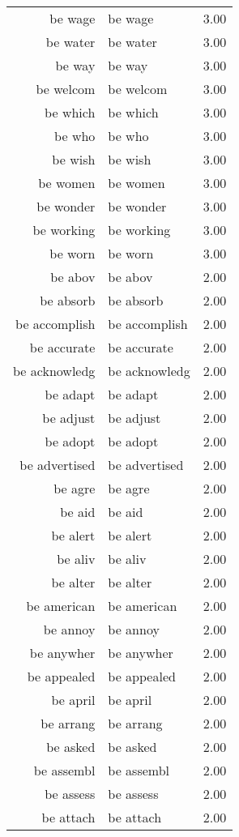 \begin{table}[ht]
\begin{tabular}{rlr}
  be wage & be wage & 3.00 \\ 
  be water & be water & 3.00 \\ 
  be way & be way & 3.00 \\ 
  be welcom & be welcom & 3.00 \\ 
  be which & be which & 3.00 \\ 
  be who & be who & 3.00 \\ 
  be wish & be wish & 3.00 \\ 
  be women & be women & 3.00 \\ 
  be wonder & be wonder & 3.00 \\ 
  be working & be working & 3.00 \\ 
  be worn & be worn & 3.00 \\ 
  be abov & be abov & 2.00 \\ 
  be absorb & be absorb & 2.00 \\ 
  be accomplish & be accomplish & 2.00 \\ 
  be accurate & be accurate & 2.00 \\ 
  be acknowledg & be acknowledg & 2.00 \\ 
  be adapt & be adapt & 2.00 \\ 
  be adjust & be adjust & 2.00 \\ 
  be adopt & be adopt & 2.00 \\ 
  be advertised & be advertised & 2.00 \\ 
  be agre & be agre & 2.00 \\ 
  be aid & be aid & 2.00 \\ 
  be alert & be alert & 2.00 \\ 
  be aliv & be aliv & 2.00 \\ 
  be alter & be alter & 2.00 \\ 
  be american & be american & 2.00 \\ 
  be annoy & be annoy & 2.00 \\ 
  be anywher & be anywher & 2.00 \\ 
  be appealed & be appealed & 2.00 \\ 
  be april & be april & 2.00 \\ 
  be arrang & be arrang & 2.00 \\ 
  be asked & be asked & 2.00 \\ 
  be assembl & be assembl & 2.00 \\ 
  be assess & be assess & 2.00 \\ 
  be attach & be attach & 2.00 \\ 

\end{tabular}
\end{table}
